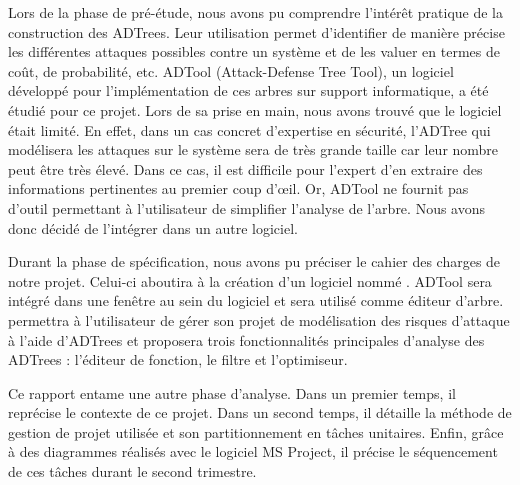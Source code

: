 Lors de la phase de pré-étude, nous avons pu comprendre l’intérêt pratique de la construction des ADTrees. Leur utilisation permet d'identifier de manière précise les différentes attaques possibles contre un système et de les valuer en termes de coût, de probabilité, etc. ADTool (Attack-Defense Tree Tool), un logiciel développé pour l'implémentation de ces arbres sur support informatique, a été étudié pour ce projet. Lors de sa prise en main, nous avons trouvé que le logiciel était limité. En effet, dans un cas concret d'expertise en sécurité, l'ADTree qui modélisera les attaques sur le système sera de très grande taille car leur nombre peut être très élevé. Dans ce cas, il est difficile pour l'expert d'en extraire des informations pertinentes au premier coup d’œil. Or, ADTool ne fournit pas d'outil permettant à l'utilisateur de simplifier l'analyse de l'arbre. Nous avons donc décidé de l'intégrer dans un autre logiciel.

Durant la phase de spécification, nous avons pu préciser le cahier des charges de notre projet. Celui-ci aboutira à la création d'un logiciel nommé \glasir{}. ADTool sera intégré dans une fenêtre au sein du logiciel et sera utilisé comme éditeur d'arbre. \glasir{} permettra à l'utilisateur de gérer son projet de modélisation des risques d'attaque à l'aide d'ADTrees et proposera trois fonctionnalités principales d'analyse des ADTrees : l'éditeur de fonction, le filtre et l'optimiseur.

Ce rapport entame une autre phase d'analyse. Dans un premier temps, il reprécise le contexte de ce projet. Dans un second temps, il détaille la méthode de gestion de projet utilisée et son partitionnement en tâches unitaires. Enfin, grâce à des diagrammes réalisés avec le logiciel MS Project, il précise le séquencement de ces tâches durant le second trimestre.